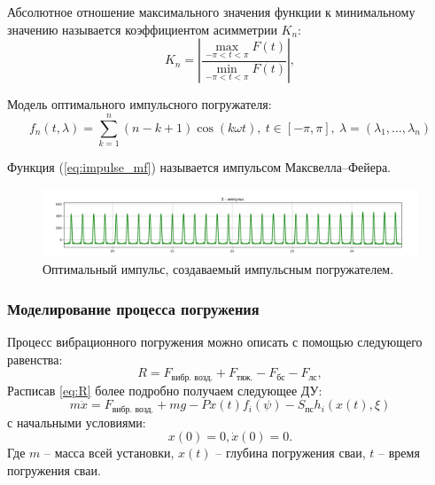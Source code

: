 \documentclass{beamer}
\begin{document}
    \begin{frame}
        Абсолютное отношение максимального значения функции к минимальному значению называется коэффициентом асимметрии $K_n$:
        \begin{equation}
            \label{eq:asymm-coef}
            K_n = \left| \frac{ \max\limits_{-\pi<t<\pi} F(t)}{\min\limits_{-\pi<t<\pi} F(t)}\right|,
        \end{equation}

        Модель оптимального импульсного погружателя:
        \begin{equation}
            \label{eq:impulse_mf}
            f_n(t, \lambda) = \sum\limits_{k = 1}^n (n-k+1) \cos(k \omega t),\ t \in [-\pi, \pi],\ \lambda =(\lambda_1, \ldots,\lambda_n)
        \end{equation}

        Функция (\ref{eq:impulse_mf}) называется импульсом Максвелла–Фейера.
    \end{frame}

    \begin{frame}
        \begin{figure}[ht]
            \centering
            \includegraphics[width=1\linewidth]{graph-impulse}
            \caption{Оптимальный импульс, создаваемый импульсным погружателем.}
            \label{fig:graph-impulse}
        \end{figure}
    \end{frame}

    \begin{frame}
        \frametitle{Моделирование процесса погружения}
        Процесс вибрационного погружения можно описать с помощью следующего равенства:
        \begin{equation}
            \label{eq:R}
            R = F_\text{вибр. возд.} + F_\text{тяж.} - F_\text{бс} - F_\text{лс},
        \end{equation}
        Расписав \ref{eq:R} более подробно получаем следующее ДУ:
        \begin{equation}
            \label{eq:main}
            m\ddot{x} = F_\text{вибр. возд.} + mg - P x(t) f_i(\psi) - S_\text{пс} h_i(x(t), \xi)
        \end{equation}
        с начальными условиями:
        \begin{equation*}
            x(0) = 0, \dot{x}(0) = 0.
        \end{equation*}
        Где $m$ -- масса всей установки, $x(t)$ -- глубина погружения сваи, $t$ -- время погружения сваи.
    \end{frame}
\end{document}
